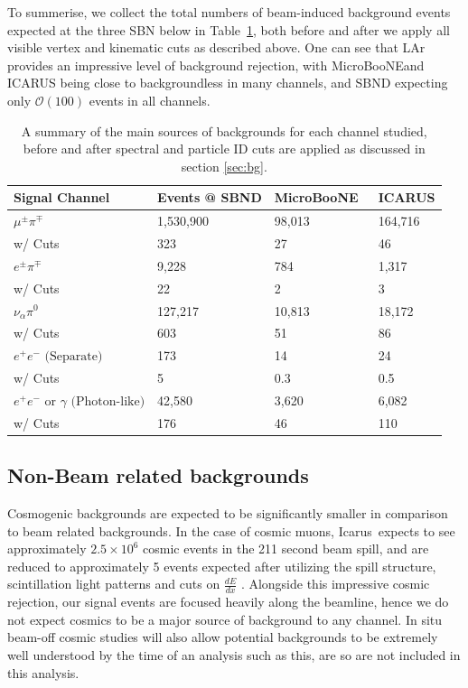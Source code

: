 \documentclass[11pt, a4paper]{article}
\newcommand{\reftab}[1]{Table~\ref{#1}}
\def\muboone{MicroBooNE}
\def\icarus{Icarus}
\begin{document}
To summerise, we collect the total numbers of beam-induced background events expected at the three SBN below in \reftab{tab:Rates}, both before and after we apply all visible vertex and kinematic cuts as described above. One can see that LAr provides an impressive level of background rejection, with \muboone and ICARUS being close to backgroundless in many channels, and SBND expecting only $\mathcal{O}(100)$ events in all channels.

\begin{table}[t]
\centering
\begin{tabular}{ l | l |  l | l |  }
	Signal Channel & Events @ SBND & \muboone\ & ICARUS \\
\hline\hline
$\mu^\pm \pi^\mp$ &  1,530,900  & 98,013 & 164,716\\
													  w/ Cuts &323 & 27 & 46 \\ \hline
$ e^\pm \pi^\mp$ &  9,228  & 784 & 1,317\\
													  w/ Cuts &22 & 2 & 3 \\ \hline
$ \nu_\alpha \pi^0$ &   127,217 & 10,813 & 18,172\\
													  w/ Cuts &603 & 51 & 86 \\ \hline
$ e^+e^- \text{ (Separate)} $ & 173 & 14 & 24\\
													  w/ Cuts &5 & 0.3 & 0.5\\ \hline
$ e^+ e^- \text{ or } \gamma \text{ (Photon-like)}$ &  42,580 & 3,620 & 6,082\\
													  w/ Cuts &176 & 46 & 110 \\ 
 \hline \hline

\end{tabular}
\caption{\label{tab:Rates} A summary of the main sources of backgrounds for each channel studied, before and after spectral and particle ID cuts are applied as discussed in section \ref{sec:bg}. }
\end{table}


\subsection{Non-Beam related backgrounds}
Cosmogenic backgrounds are expected to be significantly smaller in comparison to beam related backgrounds. In the case of cosmic muons, \icarus\ expects to see approximately $2.5 \times 10^{6}$ cosmic events in the 211 second beam spill,
and are reduced to approximately 5 events expected after utilizing the spill
structure, scintillation light patterns and cuts on $\frac{d E}{d x}$
\cite{Antonello:2015lea}.  Alongside this impressive cosmic rejection, our signal
events are focused heavily along the beamline, hence we do not expect cosmics
to be a major source of background to any channel. In situ beam-off cosmic studies will also allow potential backgrounds to be extremely well understood by the time of an analysis such as this, are so are not included in this analysis. 
\end{document}
